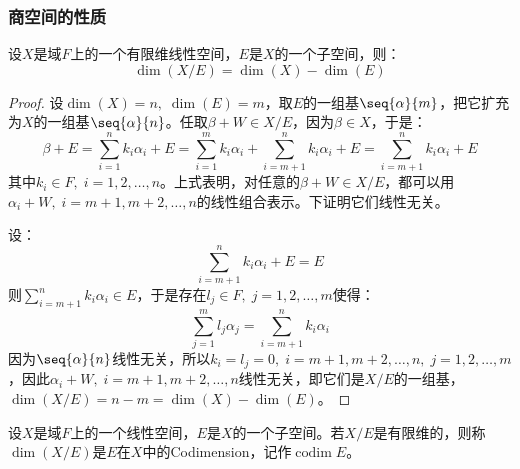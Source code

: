 \subsubsection{商空间的性质}
\begin{theorem}\label{theo:QuotientDim}
	设$X$是域$F$上的一个有限维线性空间，$E$是$X$的一个子空间，则：
	\begin{equation*}
		\dim(X/E)=\dim(X)-\dim(E)
	\end{equation*}
\end{theorem}
\begin{proof}
	设$\dim(X)=n,\;\dim(E)=m$，取$E$的一组基$\seq{\alpha}{m}$，把它扩充为$X$的一组基$\seq{\alpha}{n}$。任取$\beta+W\in X/E$，因为$\beta\in X$，于是：
	\begin{equation*}
		\beta+E=\sum_{i=1}^{n}k_i\alpha_i+E=\sum_{i=1}^{m}k_i\alpha_i+\sum_{i=m+1}^{n}k_i\alpha_i+E=\sum_{i=m+1}^{n}k_i\alpha_i+E
	\end{equation*}
	其中$k_i\in F,\;i=1,2,\dots,n$。上式表明，对任意的$\beta+W\in X/E$，都可以用$\alpha_i+W,\;i=m+1,m+2,\dots,n$的线性组合表示。下证明它们线性无关。\par
	设：
	\begin{equation*}
		\sum_{i=m+1}^{n}k_i\alpha_i+E=E
	\end{equation*}
	则$\sum\limits_{i=m+1}^{n}k_i\alpha_i\in E$，于是存在$l_j\in F,\;j=1,2,\dots,m$使得：
	\begin{equation*}
		\sum_{j=1}^{m}l_j\alpha_j=\sum_{i=m+1}^{n}k_i\alpha_i
	\end{equation*}
	因为$\seq{\alpha}{n}$线性无关，所以$k_i=l_j=0,\;i=m+1,m+2,\dots,n,\;j=1,2,\dots,m$，因此$\alpha_i+W,\;i=m+1,m+2,\dots,n$线性无关，即它们是$X/E$的一组基，$\dim(X/E)=n-m=\dim(X)-\dim(E)$。
\end{proof}
\begin{definition}
	设$X$是域$F$上的一个线性空间，$E$是$X$的一个子空间。若$X/E$是有限维的，则称$\dim(X/E)$是$E$在$X$中的\gls{Codimension}，记作$\operatorname{codim}E$。
\end{definition}
